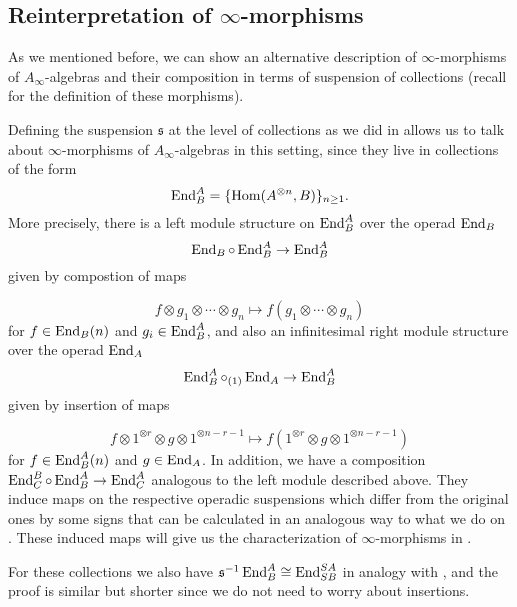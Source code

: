 \documentclass[Thesis.tex]{subfiles}
\begin{document}
\subsection{Reinterpretation of $\infty$-morphisms}\label{reinterpretation}
As we mentioned before, we can show an alternative description of $\infty$-morphisms of $A_\infty$-algebras and their composition in terms of suspension of collections (recall  for the definition of these morphisms).

Defining the suspension $\mathfrak{s}$ at the level of collections as we did in  allows us to talk about $\infty$-morphisms of $A_\infty$-algebras in this setting, since they live in collections of the form\[\operatorname{End}^A_B=\{\operatorname{Hom}(A^{\otimes n},B)\}_{n\geq 1}.\] More precisely, there is a left module structure on $\operatorname{End}^A_B$ over the operad $\operatorname{End}_B$
\[\operatorname{End}_B\circ \operatorname{End}^A_B\to \operatorname{End}^A_B\] given by compostion of maps 

\[f\otimes g_1\otimes\cdots\otimes g_n\mapsto f(g_1\otimes\cdots\otimes g_n)\]
for $f\in\operatorname{End}_B(n)$ and $g_i\in \operatorname{End}^A_B$, and also an infinitesimal right module structure over the operad  $\operatorname{End}_A$ 
\[\operatorname{End}^A_B \circ_{(1)} \operatorname{End}_A\to \operatorname{End}^A_B\]
given by insertion of maps

\[f\otimes 1^{\otimes r}\otimes g\otimes 1^{\otimes n-r-1}\mapsto f(1^{\otimes r}\otimes g\otimes 1^{\otimes n-r-1})\] for $f\in \operatorname{End}^A_B(n)$ and $g\in \operatorname{End}_A$.  In addition, we have a composition $\operatorname{End}^B_C\circ \operatorname{End}^A_B\to\operatorname{End}^A_C$ analogous to the left module described above. They induce maps on the respective operadic suspensions which differ from the original ones by some signs that can be calculated in an analogous way to what we do on . These induced maps will give us the characterization of $\infty$-morphisms in .

For these collections we also have $\mathfrak{s}^{-1}\operatorname{End}^A_B\cong \operatorname{End}^{SA}_{SB}$ in analogy with , and the proof is similar but shorter since we do not need to worry about insertions. 
\end{document}
